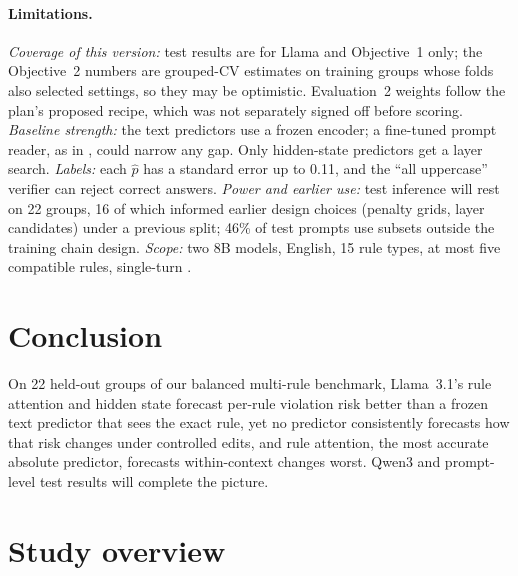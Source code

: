 \documentclass{article}
\newcommand{\phat}{\hat{p}}
\begin{document}
\paragraph{Limitations.} \emph{Coverage of this version:} test results are for Llama and Objective~1 only; the Objective~2 numbers are grouped-CV estimates on training groups whose folds also selected settings, so they may be optimistic. Evaluation~2 weights follow the plan's proposed recipe, which was not separately signed off before scoring. \emph{Baseline strength:} the text predictors use a frozen encoder; a fine-tuned prompt reader,
as in \citet{ashok2025predict}, could narrow any gap. Only hidden-state predictors get a layer search. \emph{Labels:} each $\phat$ has a standard error up to 0.11, and the ``all uppercase'' verifier can reject correct answers.
\emph{Power and earlier use:} test inference will rest on 22 groups, 16 of which informed earlier design choices
(penalty grids, layer candidates) under a previous split; 46\% of test prompts use subsets outside the training chain
design. \emph{Scope:} two 8B models, English, 15 rule types, at most five compatible rules, single-turn \citep{wallace2024hierarchy,sirdeshmukh2025multichallenge}.


\section{Conclusion}
\label{sec:conclusion}

On 22 held-out groups of our balanced multi-rule benchmark, Llama~3.1's rule attention and hidden state
forecast per-rule violation risk better than a frozen text predictor that sees the exact rule, yet no predictor
consistently forecasts how that risk changes under controlled edits, and rule attention, the most accurate absolute
predictor, forecasts within-context changes worst. Qwen3 and prompt-level test results will complete the
picture.\label{end:main}




\clearpage
\appendix

\section{Study overview}
\label{app:overview}
\end{document}
